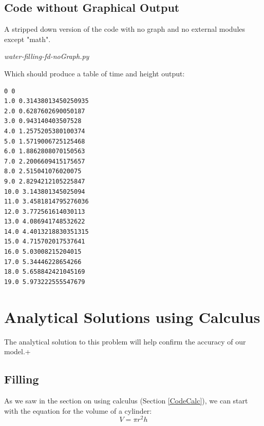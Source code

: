 \documentclass[11pt,fleqn]{book}
\begin{document}
		

	
	
	
	\subsection{Code without Graphical Output}
	A stripped down version of the code with no graph and no external modules except "math".
	
	\textit{water-filling-fd-noGraph.py}
	
	
	
	Which should produce a table of time and height output:
	
	\begin{lstlisting}
0 0
1.0 0.31438013450250935
2.0 0.6287602690050187
3.0 0.943140403507528
4.0 1.2575205380100374
5.0 1.5719006725125468
6.0 1.8862808070150563
7.0 2.2006609415175657
8.0 2.515041076020075
9.0 2.8294212105225847
10.0 3.143801345025094
11.0 3.4581814795276036
12.0 3.772561614030113
13.0 4.086941748532622
14.0 4.4013218830351315
15.0 4.715702017537641
16.0 5.03008215204015
17.0 5.34446228654266
18.0 5.658842421045169
19.0 5.973222555547679
	\end{lstlisting}



\section{Analytical Solutions using Calculus}

	The analytical solution to this problem will help confirm the accuracy of our model.+

	\subsection{Filling}

	As we saw in the section on using calculus (Section \ref{CodeCalc}), we can start with the equation for the volume of a cylinder:
	\begin{equation}
		V = \pi r^2 h
	\end{equation}
	
\end{document}
